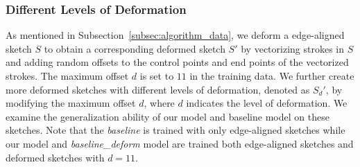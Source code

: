 \subsubsection{Different Levels of Deformation}
As mentioned in Subsection~\ref{subsec:algorithm_data}, we deform a edge-aligned sketch $S$ to obtain a corresponding deformed sketch $S'$ by vectorizing strokes in $S$ and adding random offsets to the control points and end points of the vectorized strokes. The maximum offset $d$ is set to $11$ in the training data. We further create more deformed sketches with different levels of deformation, denoted as $S_d'$, by modifying the maximum offset $d$, where $d$ indicates the level of deformation. We examine the generalization ability of our model and baseline model on these sketches. Note that the \textit{baseline} is trained with only edge-aligned sketches while our model and \textit{baseline\_deform} model are trained both edge-aligned sketches and deformed sketches with $d=11$.

